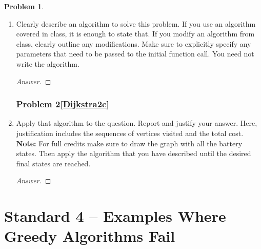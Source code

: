 \documentclass[11pt]{article}
\theoremstyle{definition}
\theoremstyle{definition}
\newtheorem{required}{Problem}
\theoremstyle{definition}
\begin{document}
\begin{required}
\begin{enumerate}[label=(\alph*)]
	\newpage
	\subsubsection{Problem 2\ref{Dijkstra2b}}
	\item \label{Dijkstra2b} Clearly describe an algorithm to solve this problem. If you use an algorithm covered in class, it is enough to state that. If you modify an algorithm from class, clearly outline any modifications. Make sure to explicitly specify any parameters that need to be passed to the initial function call. You need not write the algorithm.
	
	\begin{proof}[Answer]
	\end{proof}


	\newpage
	\subsubsection{Problem 2\ref{Dijkstra2c}}
	\item \label{Dijkstra2c} Apply that algorithm to the question. Report and justify your answer. Here, justification includes the sequences of vertices visited and the total cost. 
	\textbf{Note: }For full credits make sure to draw the graph with all the battery states. Then apply the algorithm that you have described until the desired final states are reached.

	\begin{proof}[Answer]
	\end{proof}
\end{enumerate}
\end{required}

\clearpage
\section{Standard 4 -- Examples Where Greedy Algorithms Fail}

\setcounter{subsection}{2}
\end{document}
